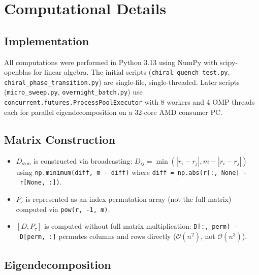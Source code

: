 \documentclass[11pt,letterpaper]{article}
\theoremstyle{definition}
\theoremstyle{remark}
\begin{document}
\section{Computational Details}\label{appendix-a-computational-details}

\subsection{Implementation}\label{implementation}

All computations were performed in Python 3.13 using NumPy with scipy-openblas for linear algebra. The initial scripts (\texttt{chiral\_quench\_test.py}, \texttt{chiral\_phase\_transition.py}) are single-file, single-threaded. Later scripts (\texttt{micro\_sweep.py}, \texttt{overnight\_batch.py}) use \texttt{concurrent.futures.\allowbreak{}ProcessPoolExecutor} with 8 workers and 4 OMP threads each for parallel eigendecomposition on a 32-core AMD consumer PC.

\subsection{Matrix Construction}\label{matrix-construction}

\begin{itemize}
\item
  \textbf{$D_{\text{sym}}$} is constructed via broadcasting: $D_{ij} = \min(|r_i - r_j|, m - |r_i - r_j|)$ using \texttt{np.minimum(diff,\ m\ -\ diff)} where \texttt{diff\ =\ np.abs(r[:,\ None]\ -\ r[None,\ :])}.
\item
  \textbf{$P_\tau$} is represented as an index permutation array (not the full matrix) computed via \texttt{pow(r,\ -1,\ m)}.
\item
  \textbf{$[D, P_\tau]$} is computed without full matrix multiplication: \texttt{D[:,\ perm]\ -\ D[perm,\ :]} permutes columns and rows directly ($\mathcal{O}(n^2)$, not $\mathcal{O}(n^3)$).
\end{itemize}

\subsection{Eigendecomposition}\label{eigendecomposition}
\end{document}
